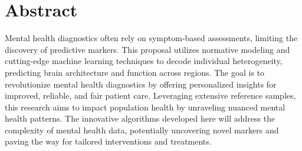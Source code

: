 \section{Abstract}
Mental health diagnostics often rely on symptom-based assessments, limiting the discovery of predictive markers. This proposal utilizes normative modeling and cutting-edge machine learning techniques to decode individual heterogeneity, predicting brain architecture and function across regions. The goal is to revolutionize mental health diagnostics by offering personalized insights for improved, reliable, and fair patient care. Leveraging extensive reference samples, this research aims to impact population health by unraveling nuanced mental health patterns. The innovative algorithms developed here will address the complexity of mental health data, potentially uncovering novel markers and paving the way for tailored interventions and treatments.
